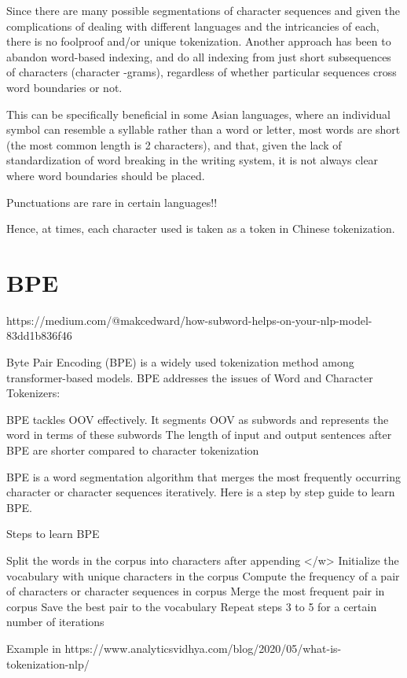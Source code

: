 Since there are many possible segmentations of character sequences and given the complications of dealing with different languages and the intricancies of each, there is no foolproof and/or unique tokenization. Another approach has been to abandon word-based indexing, and do all indexing from just short subsequences of characters (character -grams), regardless of whether particular sequences cross word boundaries or not.

This can be specifically beneficial in some Asian languages, where an individual symbol can resemble a syllable rather than a word or letter,  most words are short (the most common length is 2 characters), and that, given the lack of standardization of word breaking in the writing system, it is not always clear where word boundaries should be placed.

Punctuations are rare in certain languages!!

Hence, at times, each character used is taken as a token in Chinese tokenization.

\section{BPE}

https://medium.com/@makcedward/how-subword-helps-on-your-nlp-model-83dd1b836f46

Byte Pair Encoding (BPE) is a widely used tokenization method among transformer-based models. BPE addresses the issues of Word and Character Tokenizers:

    BPE tackles OOV effectively. It segments OOV as subwords and represents the word in terms of these subwords
    The length of input and output sentences after BPE are shorter compared to character tokenization

BPE is a word segmentation algorithm that merges the most frequently occurring character or character sequences iteratively. Here is a step by step guide to learn BPE.

Steps to learn BPE

    Split the words in the corpus into characters after appending </w>
    Initialize the vocabulary with unique characters in the corpus
    Compute the frequency of a pair of characters or character sequences in corpus
    Merge the most frequent pair in corpus
    Save the best pair to the vocabulary
    Repeat steps 3 to 5 for a certain number of iterations

Example in https://www.analyticsvidhya.com/blog/2020/05/what-is-tokenization-nlp/

